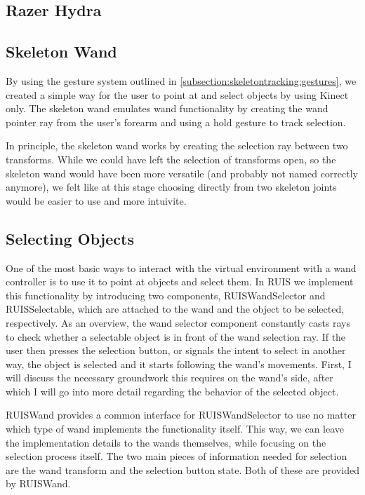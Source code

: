 \documentclass[12pt,a4paper,oneside,pdftex]{report}
\begin{document}
\subsection{Razer Hydra}
\label{subsection:wandcontrollers:hydra}

\subsection{Skeleton Wand}
\label{subsection:wandcontrollers:skeleton}

By using the gesture system outlined in \ref{subsection:skeletontracking:gestures}, we created a simple way for the user to point at and select objects by using Kinect only. The skeleton wand emulates wand functionality by creating the wand pointer ray from the user's forearm and using a hold gesture to track selection. 

In principle, the skeleton wand works by creating the selection ray between two transforms. While we could have left the selection of transforms open, so the skeleton wand would have been more versatile (and probably not named correctly anymore), we felt like at this stage choosing directly from two skeleton joints would be easier to use and more intuivite.

\subsection{Selecting Objects}
\label{subsection:wandcontrollers:selection}

One of the most basic ways to interact with the virtual environment with a wand controller is to use it to point at objects and select them. In RUIS we implement this functionality by introducing two components, RUISWandSelector and RUISSelectable, which are attached to the wand and the object to be selected, respectively. As an overview, the wand selector component constantly casts rays to check whether a selectable object is in front of the wand selection ray. If the user then presses the selection button, or signals the intent to select in another way, the object is selected and it starts following the wand's movements. First, I will discuss the necessary groundwork this requires on the wand's side, after which I will go into more detail regarding the behavior of the selected object.

RUISWand provides a common interface for RUISWandSelector to use no matter which type of wand implements the functionality itself. This way, we can leave the implementation details to the wands themselves, while focusing on the selection process itself. The two main pieces of information needed for selection are the wand transform and the selection button state. Both of these are provided by RUISWand.
\end{document}
